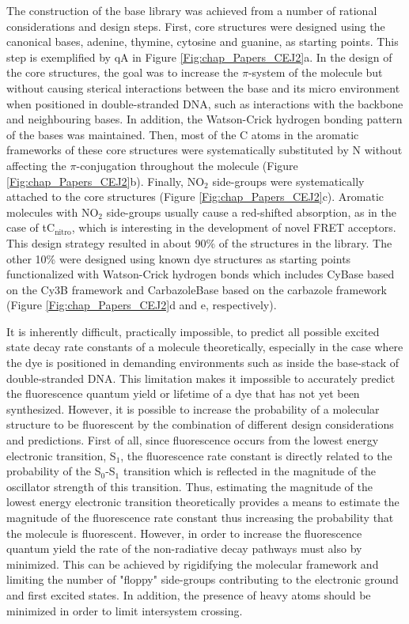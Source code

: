  The construction of the base library was achieved from a number of rational considerations and design steps. First, core structures were designed using the canonical bases, adenine, thymine, cytosine and guanine, as starting points. This step is exemplified by qA in Figure \ref{Fig:chap_Papers_CEJ2}a. In the design of the core structures, the goal was to increase the $\pi$-system of the molecule but without causing sterical interactions between the base and its micro environment when positioned in double-stranded DNA, such as interactions with the backbone and neighbouring bases. In addition, the Watson-Crick hydrogen bonding pattern of the bases was maintained. Then, most of the C atoms in the aromatic frameworks of these core structures were systematically substituted by N without affecting the $\pi$-conjugation throughout the molecule (Figure \ref{Fig:chap_Papers_CEJ2}b). Finally, NO$_2$ side-groups were systematically attached to the core structures (Figure \ref{Fig:chap_Papers_CEJ2}c). Aromatic molecules with NO$_2$ side-groups usually cause a red-shifted absorption, as in the case of tC$_\mathrm{nitro}$, which is interesting in the development of novel FRET acceptors. This design strategy resulted in about 90\% of the structures in the library. The other 10\% were designed using known dye structures as starting points functionalized with Watson-Crick hydrogen bonds which includes CyBase based on the Cy3B framework and CarbazoleBase based on the carbazole framework (Figure \ref{Fig:chap_Papers_CEJ2}d and e, respectively).

 It is inherently difficult, practically impossible, to predict all possible excited state decay rate constants of a molecule theoretically, especially in the case where the dye is positioned in demanding environments such as inside the base-stack of double-stranded DNA. This limitation makes it impossible to accurately predict the fluorescence quantum yield or lifetime of a dye that has not yet been synthesized. However, it is possible to increase the probability of a molecular structure to be fluorescent by the combination of different design considerations and predictions. First of all, since fluorescence occurs from the lowest energy electronic transition, S$_1$, the fluorescence rate constant is directly related to the probability of the S$_0$-S$_1$ transition which is reflected in the magnitude of the oscillator strength of this transition.\cite{Strickler1962} Thus, estimating the magnitude of the lowest energy electronic transition theoretically provides a means to estimate the magnitude of the fluorescence rate constant thus increasing the probability that the molecule is fluorescent. However, in order to increase the fluorescence quantum yield the rate of the non-radiative decay pathways must also by minimized. This can be achieved by rigidifying the molecular framework and limiting the number of "floppy" side-groups contributing to the electronic ground and first excited states.\cite{Valeur} In addition, the presence of heavy atoms should be minimized in order to limit intersystem crossing.

